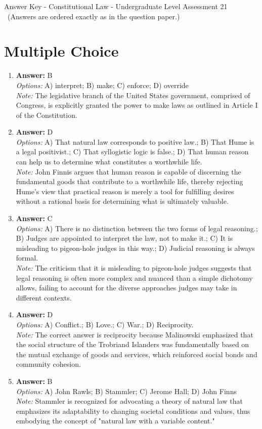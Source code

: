 \documentclass[12pt]{article}
\begin{document}
\begin{center}
Answer Key - Constitutional Law - Undergraduate Level Assessment 21 \
\small (Answers are ordered exactly as in the question paper.)
\end{center}

\section*{Multiple Choice}
\begin{enumerate}[label=\arabic*.]
\item \textbf{Answer:} B
\\ \textit{Options:} A) interpret; B) make; C) enforce; D) override
\\ \textit{Note:} The legislative branch of the United States government, comprised of Congress, is explicitly granted the power to make laws as outlined in Article I of the Constitution.
\item \textbf{Answer:} D
\\ \textit{Options:} A) That natural law corresponds to positive law.; B) That Hume is a legal positivist.; C) That syllogistic logic is false.; D) That human reason can help us to determine what constitutes a worthwhile life.
\\ \textit{Note:} John Finnis argues that human reason is capable of discerning the fundamental goods that contribute to a worthwhile life, thereby rejecting Hume's view that practical reason is merely a tool for fulfilling desires without a rational basis for determining what is ultimately valuable.
\item \textbf{Answer:} C
\\ \textit{Options:} A) There is no distinction between the two forms of legal reasoning.; B) Judges are appointed to interpret the law, not to make it.; C) It is misleading to pigeon-hole judges in this way.; D) Judicial reasoning is always formal.
\\ \textit{Note:} The criticism that it is misleading to pigeon-hole judges suggests that legal reasoning is often more complex and nuanced than a simple dichotomy allows, failing to account for the diverse approaches judges may take in different contexts.
\item \textbf{Answer:} D
\\ \textit{Options:} A) Conflict.; B) Love.; C) War.; D) Reciprocity.
\\ \textit{Note:} The correct answer is reciprocity because Malinowski emphasized that the social structure of the Trobriand Islanders was fundamentally based on the mutual exchange of goods and services, which reinforced social bonds and community cohesion.
\item \textbf{Answer:} B
\\ \textit{Options:} A) John Rawls; B) Stammler; C) Jerome Hall; D) John Finns
\\ \textit{Note:} Stammler is recognized for advocating a theory of natural law that emphasizes its adaptability to changing societal conditions and values, thus embodying the concept of "natural law with a variable content."
\end{enumerate}
\end{document}
